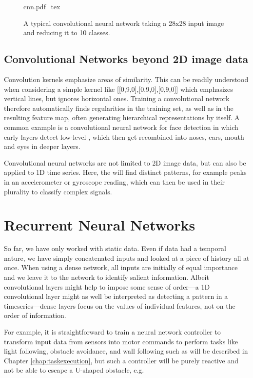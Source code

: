 \begin{figure}[htb]
\tiny
    \centering
    \def\svgwidth{\textwidth}
    {cnn.pdf_tex}
    \caption{A typical convolutional neural network taking a 28x28 input image and reducing it to 10 classes.\label{fig:cnn}}
\end{figure}


\subsection{Convolutional Networks beyond 2D image data}

Convolution kernels emphasize areas of similarity. This can be readily understood when considering a simple kernel like [[0,9,0],[0,9,0],[0,9,0]] which emphasizes vertical lines, but ignores horizontal ones. Training a convolutional network therefore automatically finds regularities in the training set, as well as in the resulting feature map, often generating hierarchical representations by itself. A common example is a convolutional neural network for face detection in which early layers detect low-level , which then get recombined into noses, ears, mouth and eyes in deeper layers.

Convolutional neural networks are not limited to 2D image data, but can also be applied to 1D time series. Here, the will find distinct patterns, for example peaks in an accelerometer or gyroscope reading, which can then be used in their plurality to classify complex signals. 

\section{Recurrent Neural Networks}
So far, we have only worked with static data. Even if data had a temporal nature, we have simply concatenated inputs and looked at a piece of history all at once. When using a dense network, all inputs are initially of equal importance and we leave it to the network to identify salient information. Albeit convolutional layers might help to impose some sense of order---a 1D convolutional layer might as well be interpreted as detecting a pattern in a timeseries---dense layers focus on the values of individual features, not on the order of information.

For example, it is straightforward to train a neural network controller to transform input data from sensors into motor commands to perform tasks like light following, obstacle avoidance, and wall following such as will be described in Chapter \ref{chap:taskexecution}, but such a controller will be purely reactive and not be able to escape a U-shaped obstacle, e.g.

